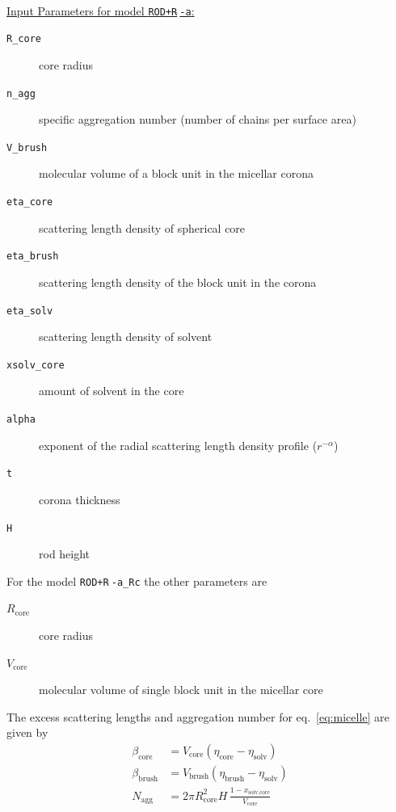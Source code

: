 \vspace{3mm}

\hspace{1pt}\\
\uline{Input Parameters for model \texttt{ROD+R$\hat{~}$-a}:}
\begin{description}
\item[\texttt{R\_core}] core radius
\item[\texttt{n\_agg}] specific aggregation number (number of chains per surface area)
\item[\texttt{V\_brush}]  molecular volume of a block unit in the micellar corona
\item[\texttt{eta\_core}] scattering length density of spherical core
\item[\texttt{eta\_brush}] scattering length density of the block unit in the corona
\item[\texttt{eta\_solv}] scattering length density of solvent
\item[\texttt{xsolv\_core}] amount of solvent in the core
\item[\texttt{alpha}] exponent of the radial scattering length density profile ($r^{-\alpha}$)
\item[\texttt{t}] corona thickness
\item[\texttt{H}] rod height
\end{description}


\vspace{3mm}
\noindent
For the model \texttt{ROD+R$\hat{~}$-a\_Rc} the other parameters are
\begin{description}
\item[$R_\text{core}$] core radius
\item[$V_\text{core}$] molecular volume of single block unit in the micellar core
\end{description}
The excess scattering lengths and aggregation number for eq.\
\ref{eq:micelle} are given by
\begin{align}
\beta_\text{core}  &= V_\text{core}  (\eta_\text{core} -\eta_\text{solv}) \\
\beta_\text{brush} &= V_\text{brush} (\eta_\text{brush}-\eta_\text{solv}) \\
N_\text{agg} &=  2\pi R_\text{core}^2H   \, \frac{1-x_\text{solv,core}}{V_\text{core}}
\end{align}

